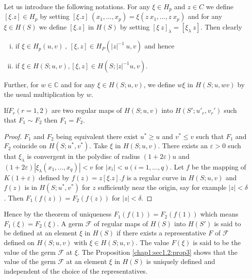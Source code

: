 Let us introduce the following notations. For any $\xi \in H_p$ and $z
\in C$ we define $[\xi. z] \in H_p$ by setting $[\xi.z] ~ (x_1,
\ldots,  x_p) = \xi (z ~ x_1,  \ldots,  z ~ x_p)$ and for any $\xi \in
H(S)$ we define $[\xi. z]$ in $H(S)$ by setting $[\xi ~ z]_\lambda =
[\xi_\lambda ~z]$. Then clearly 
\begin{enumerate}[(i)]
\item if $\xi \in H_p (u,  v) ~ ,  ~ [\xi,  z] \in H_P (| z |^{-1} ~
  u,  v)$ and hence 
\item if $\xi \in H(S; u,  v),  [\xi,  z] \in H(S; | z |^{-1} u,  v)$.
\end{enumerate}

Further,  for $w \in \mathbb{C}$ and for any $\xi \in H(S; u,  v)$,
we define $w \xi$ in $H(S; u,  wv)$ by the usual multiplication by
$w$. 

\begin{proposition}\label{chap1:sec1.2:prop3}%
  If\pageoriginale $F_r (r = 1,  2)$ are two regular maps of $H(S; u,  v)$ into
  $H(S'; u'_r,  v_r')$ such that $F_1 \sim F_2$ then $F_1 = F_2$. 
\end{proposition}

\begin{proof}%
  $F_1$ and $F_2$ being equivalent there exist $u^* \geq u$ and $v^*
  \leq v$ such that $F_1$ and $F_2$ coincide on $H(S; u^*,
  v^*)$. Take $\xi$ in $H(S; u,  v)$. There exists an $\varepsilon >
  0$ such that $\xi_\lambda$ is convergent in the polydisc of radius
  $(1+2 \varepsilon)u$ and $(1+ 2 \varepsilon) | \xi_\lambda (x_1,
  \ldots,  x_q) | < v$ for $| x_i | < u (i = 1,  \ldots,  q)$. Let $f$
  be the mapping of $K(1 + \varepsilon)$ defined by $f(z) = z [\xi
    . z]. f$ is a regular curve in $H(S; u,  v)$ and  $f(z)$ is in
  $H(S; u^*,  v^*)$ for $z$ sufficiently near the origin,  say for
  example $| z | < \delta$. Then $F_1 (f(z)) = F_2(f(z))$ for $| z | <
  \delta$. 
\end{proof}

  Hence by the theorem of uniqueness $F_1(f(1)) = F_2(f(1))$
  which means $F_1(\xi) = F_2(\xi)$. A germ $\mathscr{F}$ of regular
  maps of $H(S)$ into $H(S')$ is said to be defined at an element $\xi$
  in $H(S)$ if there exists a representative $F$ of  $\mathscr{F}$
  defined on $H(S; u,  v)$ with  $ \xi \in H(S; u,  v)$. The value
  $F(\xi)$ is said to be the value of the germ $\mathscr{F}$ at
  $\xi$. 
  The Proposition \ref{chap1:sec1.2:prop3} shows that the value of the germ $\mathscr{F}$
  at an element $\xi$ in $H(S)$ is uniquely defined and independent of
  the choice of the representatives. 

